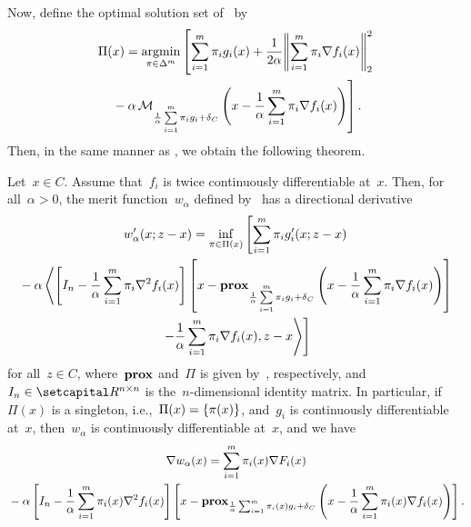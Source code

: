 \documentclass[../../main]{subfiles}
\begin{document}
                        Now, define the optimal solution set of~ by
                        \begin{multline} \label{eq:Pi}
                            \Pi(x) = \argmin_{\pi \in \Delta^m} \left[ \sum_{i = 1}^{m} \pi_i g_i(x) + \frac{1}{2 \alpha} \norm*{\sum_{i = 1}^{m} \pi_i \nabla f_i(x)}_2^2 \right. \\
                            \left. {}- \alpha \envelope_{\frac{1}{\alpha} \sum\limits_{i = 1}^{m} \pi_i g_i + \indicator_C}\left( x - \frac{1}{\alpha} \sum_{i = 1}^{m} \pi_i \nabla f_i(x) \right) \right] 
                        .\end{multline} 
                        Then, in the same manner as , we obtain the following theorem.
                        \begin{theorem} 
                            Let~$x \in C$.
                            Assume that~$f_i$ is twice continuously differentiable at~$x$.
                            Then, for all~$\alpha > 0$, the merit function~$w_\alpha$ defined by~ has a directional derivative
                            \begin{multline}
                                w_\alpha'(x; z - x) = \inf_{\pi \in \Pi(x)} \left[ \sum_{i = 1}^{m} \pi_i g_i'(x; z - x) \right. \\
                                {}- \alpha \left\langle \left[ I_n - \frac{1}{\alpha} \sum_{i = 1}^{m} \pi_i \nabla^2 f_i(x) \right] \left[x - \prox_{\frac{1}{\alpha} \sum\limits_{i = 1}^{m} \pi_i g_i + \indicator_C} \left( x - \frac{1}{\alpha} \sum_{i = 1}^{m} \pi_i \nabla f_i(x) \right) \right] \right.\\
                                \left. \left.- \frac{1}{\alpha} \sum_{i = 1}^{m} \pi_i \nabla f_i(x) , z - x \right\rangle \right] 
                            \end{multline}
                            for all~$z \in C$, where~$\prox$ and~$\Pi$ is given by~, respectively, and~$I_n \in \setR^{n \times n}$ is the~$n$-dimensional identity matrix.
                            In particular, if~$\Pi(x)$ is a singleton, i.e.,~$\Pi(x) = \set*{\pi(x)}$, and~$g_i$ is continuously differentiable at~$x$, then~$w_\alpha$ is continuously differentiable at~$x$, and we have
                            \begin{multline}
                                \nabla w_\alpha(x) = \sum_{i = 1}^{m} \pi_i(x) \nabla F_i(x) \\
                                {}- \alpha \left[ I_n - \frac{1}{\alpha} \sum_{i = 1}^{m} \pi_i(x) \nabla^2 f_i(x) \right] \left[x - \prox_{\frac{1}{\alpha} \sum_{i = 1}^{m} \pi_i(x) g_i + \indicator_C} \left( x - \frac{1}{\alpha} \sum_{i = 1}^{m} \pi_i(x) \nabla f_i(x) \right) \right]
                            .\end{multline}
                        \end{theorem}
\end{document}
